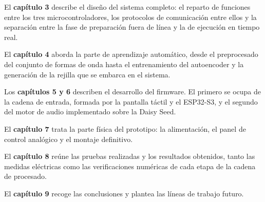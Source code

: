 El \textbf{capítulo 3} describe el diseño del sistema completo: el reparto de
funciones entre los tres microcontroladores, los protocolos de comunicación
entre ellos y la separación entre la fase de preparación fuera de línea y la de
ejecución en tiempo real.

El \textbf{capítulo 4} aborda la parte de aprendizaje automático, desde el
preprocesado del conjunto de formas de onda hasta el entrenamiento del
autoencoder y la generación de la rejilla que se embarca en el sistema.

Los \textbf{capítulos 5 y 6} describen el desarrollo del firmware. El primero se
ocupa de la cadena de entrada, formada por la pantalla táctil y el ESP32-S3, y
el segundo del motor de audio implementado sobre la Daisy Seed.

El \textbf{capítulo 7} trata la parte física del prototipo: la alimentación, el
panel de control analógico y el montaje definitivo.

El \textbf{capítulo 8} reúne las pruebas realizadas y los resultados obtenidos,
tanto las medidas eléctricas como las verificaciones numéricas de cada etapa de
la cadena de procesado.

El \textbf{capítulo 9} recoge las conclusiones y plantea las líneas de trabajo
futuro.
